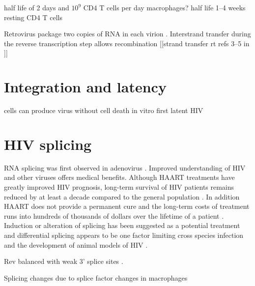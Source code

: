 \documentclass[../sherrill-Mix_thesis.tex]{subfiles}
\begin{document}

half life of 2 days and $10^9$ CD4 T cells per day \citep{Ho1995,Wei1995,Perelson1997}
macrophages? half life 1--4 weeks \citep{Perelson1997,Lambotte2000,Zhu2002} 
resting CD4 T cells\citep{Finzi1997,Chun1997,Wong1997}

Retrovirus package two copies of RNA in each virion \citep{Bellamy1974,Kung1974,Kung1975}. Interstrand transfer during the reverse transcription step allows recombination \citep{Panganiban1988,Hu1990,Hu1990a}
[[strand transfer rt refs 3--5 in \citep{Panganiban1988}]]

\section{Integration and latency}
	cells can produce virus without cell death in vitro \citep{Hoxie1985}
	first latent HIV \citep{Folks1986}

\section{HIV splicing}
	RNA splicing was first observed in adenovirus \citep{Berget1977,Chow1977}. Improved understanding of HIV and other viruses offers medical benefits. Although HAART treatments have greatly improved HIV prognosis, long-term survival of HIV patients remains reduced by at least a decade compared to the general population \citep{Lohse2007}. In addition HAART does not provide a permanent cure \citep{Richman2009} and the long-term costs of treatment runs into hundreds of thousands of dollars over the lifetime of a patient \citep{Hutchinson2006,Schackman2006}.  Induction or alteration of splicing has been suggested as a potential treatment \citep{Fukuhara2006,Mandal2010} and differential splicing appears to be one factor limiting cross species infection and the development of animal models of HIV \citep{Zheng2003}. 

	Rev balanced with weak 3' splice sites \citep{Kammler2006}.

Splicing changes due to splice factor changes in macrophages \citep{Dowling2008}
\end{document}
